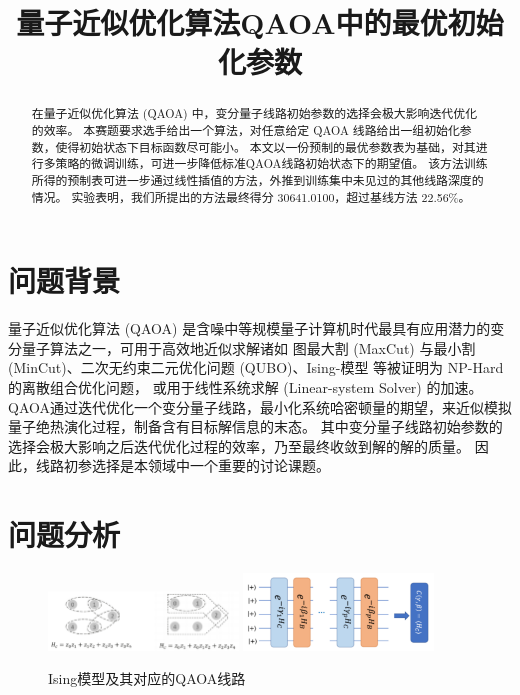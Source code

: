 \documentclass[withoutpreface,bwprint]{cumcmthesis}
\title{量子近似优化算法QAOA中的最优初始化参数}
\begin{document}
\maketitle
\begin{abstract}
在量子近似优化算法 (QAOA) 中，变分量子线路初始参数的选择会极大影响迭代优化的效率。
本赛题要求选手给出一个算法，对任意给定 QAOA 线路给出一组初始化参数，使得初始状态下目标函数尽可能小。
本文以一份预制的最优参数表为基础，对其进行多策略的微调训练，可进一步降低标准QAOA线路初始状态下的期望值。
该方法训练所得的预制表可进一步通过线性插值的方法，外推到训练集中未见过的其他线路深度的情况。
实验表明，我们所提出的方法最终得分 30641.0100，超过基线方法 22.56\%。

\end{abstract}




\section{问题背景}

量子近似优化算法 (QAOA) 是含噪中等规模量子计算机时代最具有应用潜力的变分量子算法之一，可用于高效地近似求解诸如
图最大割 (MaxCut) 与最小割 (MinCut)、二次无约束二元优化问题 (QUBO)、Ising-模型 等被证明为 NP-Hard 的离散组合优化问题，
或用于线性系统求解 (Linear-system Solver) 的加速。
QAOA通过迭代优化一个变分量子线路，最小化系统哈密顿量的期望，来近似模拟量子绝热演化过程，制备含有目标解信息的末态。
其中变分量子线路初始参数的选择会极大影响之后迭代优化过程的效率，乃至最终收敛到解的解的质量。
因此，线路初参选择是本领域中一个重要的讨论课题。


\section{问题分析}

\begin{figure}
	\centering
	{\includegraphics[width=0.45\textwidth]{figures/ising_model.png}}
	{\includegraphics[width=0.45\textwidth]{figures/qaoa_circ.png}}
	\caption{Ising模型及其对应的QAOA线路}
	\label{fig:ising-qaoa}
\end{figure}
\end{document}
